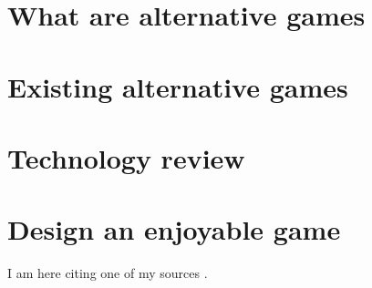 \documentclass[../Main.tex]{subfiles}
\begin{document}
\section{What are alternative games}
\section{Existing alternative games}
\section{Technology review}
\section{Design an enjoyable game}

I am here citing one of my sources \citep{ISLR}.

\biblio %
\end{document}
